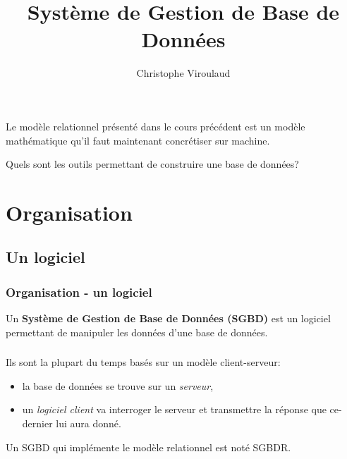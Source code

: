 \documentclass[svgnames,11pt]{beamer}
\author[]{Christophe Viroulaud}
\title{Système de Gestion de Base de Données}
\date{\framebox{\textbf{BDD 03}}}
\institute{Terminale - NSI}
\begin{document}
\begin{frame}
\titlepage
\end{frame}
\begin{frame}
    \frametitle{}

    Le modèle relationnel présenté dans le cours précédent est un modèle mathématique qu'il faut maintenant concrétiser sur machine.
\begin{framed}\centering 
    Quels sont les outils permettant de construire une base de données?
\end{framed}

\end{frame}
\section{Organisation}
\subsection{Un logiciel}
\begin{frame}
    \frametitle{Organisation - un logiciel}

    Un \textbf{Système de Gestion de Base de Données (SGBD)} est un logiciel permettant de manipuler les données d'une base de données.    

\end{frame}
\begin{frame}
    \frametitle{}

    Ils sont la plupart du temps basés sur un modèle client-serveur:
\begin{itemize}
\item la base de données se trouve sur un \emph{serveur},
\item un \emph{logiciel client} va interroger le serveur et transmettre la réponse que ce-dernier lui aura donné.
\end{itemize}
\begin{aretenir}[Remarque]
    Un SGBD qui implémente le modèle relationnel est noté SGBDR. 
\end{aretenir}
\end{frame}
\end{document}

